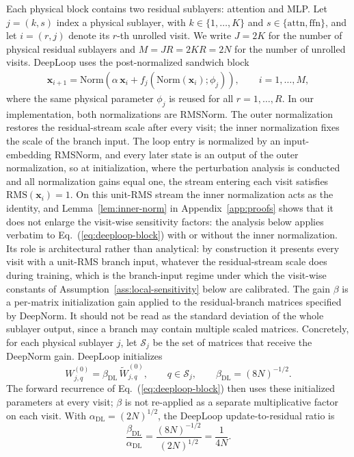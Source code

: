 \documentclass[11pt]{airesearch}
\begin{document}
Each physical block contains two residual sublayers: attention and MLP. Let
$j=(k,s)$ index a physical sublayer, with $k\in\{1,\ldots,K\}$ and
$s\in\{\mathrm{attn},\mathrm{ffn}\}$, and let $i=(r,j)$ denote its $r$-th
unrolled visit. We write $J=2K$ for the number of physical residual sublayers
and $M=JR=2KR=2N$ for the number of unrolled visits. DeepLoop uses the
post-normalized sandwich block
\begin{align}
  \mathbf{x}_{i+1}
  = \mathrm{Norm}\left(
      \alpha\,\mathbf{x}_i
      + f_j(\mathrm{Norm}(\mathbf{x}_i);\phi_j)
    \right),
  \qquad i=1,\ldots,M,
  \label{eq:deeploop-block}
\end{align}
where the same physical parameter $\phi_j$ is reused for all $r=1,\ldots,R$.
In our implementation, both normalizations are RMSNorm. The outer
normalization restores the residual-stream scale after every visit; the
inner normalization fixes the scale of the branch input. The loop entry is
normalized by an input-embedding RMSNorm, and every later state is an output
of the outer normalization, so at initialization, where the perturbation
analysis is conducted and all normalization gains equal one, the stream
entering each visit satisfies $\mathrm{RMS}(\mathbf{x}_i)=1$. On this
unit-RMS stream the inner normalization acts as the identity, and
Lemma~\ref{lem:inner-norm} in Appendix~\ref{app:proofs} shows that it does
not enlarge the visit-wise sensitivity factors: the analysis below applies
verbatim to Eq.~(\ref{eq:deeploop-block}) with or without the inner
normalization. Its role is architectural rather than analytical: by
construction it presents every visit with a unit-RMS branch input, whatever
the residual-stream scale does during training, which is the branch-input
regime under which the visit-wise constants of
Assumption~\ref{ass:local-sensitivity} below are calibrated. The gain $\beta$ is a
per-matrix initialization gain applied to the residual-branch matrices specified
by DeepNorm. It should not be read as the standard deviation of the whole
sublayer output, since a branch may contain multiple scaled matrices. Concretely,
for each physical sublayer $j$, let $\mathcal{S}_j$ be the set of matrices that
receive the DeepNorm gain. DeepLoop initializes
\begin{equation}
  W_{j,q}^{(0)}
  =
  \beta_{\mathrm{DL}}\,
  \widetilde W_{j,q}^{(0)},
  \qquad
  q\in\mathcal{S}_j,
  \qquad
  \beta_{\mathrm{DL}}=(8N)^{-1/2}.
  \label{eq:deeploop-beta-usage}
\end{equation}
The forward recurrence of Eq.~(\ref{eq:deeploop-block}) then uses these
initialized parameters at every visit; $\beta$ is not re-applied as a
separate multiplicative factor on each visit. With
$\alpha_{\mathrm{DL}}=(2N)^{1/2}$, the DeepLoop update-to-residual ratio is
\begin{equation}
  \frac{\beta_{\mathrm{DL}}}{\alpha_{\mathrm{DL}}}
  =
  \frac{(8N)^{-1/2}}{(2N)^{1/2}}
  =
  \frac{1}{4N}.
  \label{eq:deeploop-beta-over-alpha-setup}
\end{equation}
\end{document}
